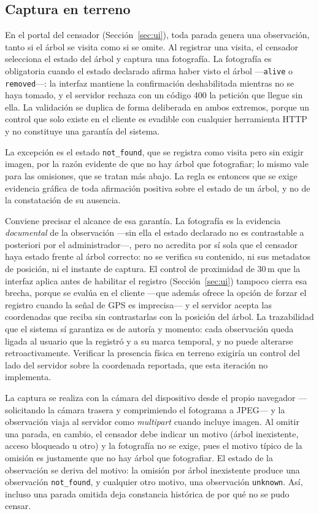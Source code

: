 \subsection{Captura en terreno}

En el portal del censador (Sección~\ref{sec:ui}), toda parada genera una observación,
tanto si el árbol se visita como si se omite. Al registrar una visita, el censador
selecciona el estado del árbol y captura una fotografía. La fotografía es obligatoria
cuando el estado declarado afirma haber visto el árbol ---\texttt{alive} o
\texttt{removed}---: la interfaz mantiene la confirmación deshabilitada mientras no se
haya tomado, y el servidor rechaza con un código 400 la petición que llegue sin ella.
La validación se duplica de forma deliberada en ambos extremos, porque un control que
solo existe en el cliente es evadible con cualquier herramienta HTTP y no constituye
una garantía del sistema.

La excepción es el estado \texttt{not\_found}, que se registra como visita pero sin
exigir imagen, por la razón evidente de que no hay árbol que fotografiar; lo mismo
vale para las omisiones, que se tratan más abajo. La regla es entonces que se exige
evidencia gráfica de toda afirmación positiva sobre el estado de un árbol, y no de la
constatación de su ausencia.

Conviene precisar el alcance de esa garantía. La fotografía es la evidencia
\textit{documental} de la observación ---sin ella el estado declarado no es
contrastable a posteriori por el administrador---, pero no acredita por sí sola que el
censador haya estado frente al árbol correcto: no se verifica su contenido, ni sus
metadatos de posición, ni el instante de captura. El control de proximidad de
$30$\,m que la interfaz aplica antes de habilitar el registro
(Sección~\ref{sec:ui}) tampoco cierra esa brecha, porque se evalúa en el cliente
---que además ofrece la opción de forzar el registro cuando la señal de GPS es
imprecisa--- y el servidor acepta las coordenadas que reciba sin contrastarlas con la
posición del árbol. La trazabilidad que el sistema sí garantiza es de autoría y
momento: cada observación queda ligada al usuario que la registró y a su marca
temporal, y no puede alterarse retroactivamente. Verificar la presencia física en
terreno exigiría un control del lado del servidor sobre la coordenada reportada, que
esta iteración no implementa.

La captura se realiza con la cámara del dispositivo desde el propio navegador
---solicitando la cámara trasera y comprimiendo el fotograma a JPEG--- y la
observación viaja al servidor como \textit{multipart} cuando incluye imagen. Al
omitir una parada, en cambio, el censador debe indicar un motivo (árbol inexistente,
acceso bloqueado u otro) y la fotografía no se exige, pues el motivo típico
de la omisión es justamente que no hay árbol que fotografiar. El estado de la
observación se deriva del motivo: la omisión por árbol inexistente produce una
observación \texttt{not\_found}, y cualquier otro motivo, una observación
\texttt{unknown}. Así, incluso una parada omitida deja constancia histórica de por
qué no se pudo censar.

